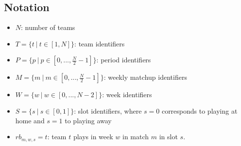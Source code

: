 \documentclass{article}
\begin{document}
\subsection{Notation}
\begin{itemize}
  \item $N$: number of teams
  \item $T=\{t\ |\ t \in [1, N]\}$: team identifiers
  \item $P=\{p\ |\ p \in [0, ..., \frac{N}{2} - 1]\}$: period identifiers
  \item $M=\{m\ |\ m \in [0, ..., \frac{N}{2} - 1]\}$: weekly matchup identifiers
  \item $W=\{w\ |\ w \in [0, ..., N-2]\}$: week identifiers
  \item $S=\{s\ |\ s \in [0,1]\}$: slot identifiers, where $s=0$ corresponds to playing at home and $s=1$ to playing away
  \item $rb_{m, w, s}=t$: team $t$ plays in week $w$ in match $m$ in slot $s$.
  
\end{itemize}













\end{document}
